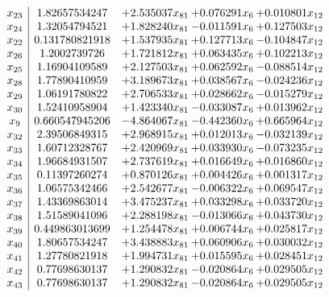 \documentclass[11pt]{article}
\begin{document}
\[\begin{array}{c| c c@{\hskip 2pt} c@{\hskip 2pt} c@{\hskip 2pt} }
 x_{23}   &  1.82657534247 & + 2.535037 x_{81} & + 0.076291 x_{6} & + 0.010801 x_{12}\\
 x_{24}   &  1.32054794521 & + 1.828240 x_{81} & -0.011591 x_{6} & + 0.127503 x_{12}\\
 x_{22}   &  0.131780821918 & + 1.537935 x_{81} & + 0.127713 x_{6} & -0.104847 x_{12}\\
 x_{26}   &  1.2002739726 & + 1.721812 x_{81} & + 0.063435 x_{6} & + 0.102213 x_{12}\\
 x_{25}   &  1.16904109589 & + 2.127503 x_{81} & + 0.062592 x_{6} & -0.088514 x_{12}\\
 x_{28}   &  1.77890410959 & + 3.189673 x_{81} & + 0.038567 x_{6} & -0.024236 x_{12}\\
 x_{29}   &  1.06191780822 & + 2.706533 x_{81} & + 0.028662 x_{6} & -0.015279 x_{12}\\
 x_{30}   &  1.52410958904 & + 1.423340 x_{81} & -0.033087 x_{6} & + 0.013962 x_{12}\\
 x_{9}   &  0.660547945206 & -4.864067 x_{81} & -0.442360 x_{6} & + 0.665964 x_{12}\\
 x_{32}   &  2.39506849315 & + 2.968915 x_{81} & + 0.012013 x_{6} & -0.032139 x_{12}\\
 x_{33}   &  1.60712328767 & + 2.420969 x_{81} & + 0.033930 x_{6} & -0.073235 x_{12}\\
 x_{34}   &  1.96684931507 & + 2.737619 x_{81} & + 0.016649 x_{6} & + 0.016860 x_{12}\\
 x_{35}   &  0.11397260274 & + 0.870126 x_{81} & + 0.004426 x_{6} & + 0.001317 x_{12}\\
 x_{36}   &  1.06575342466 & + 2.542677 x_{81} & -0.006322 x_{6} & + 0.069547 x_{12}\\
 x_{37}   &  1.43369863014 & + 3.475237 x_{81} & + 0.033298 x_{6} & + 0.033720 x_{12}\\
 x_{38}   &  1.51589041096 & + 2.288198 x_{81} & -0.013066 x_{6} & + 0.043730 x_{12}\\
 x_{39}   &  0.449863013699 & + 1.254478 x_{81} & + 0.006744 x_{6} & + 0.025817 x_{12}\\
 x_{40}   &  1.80657534247 & + 3.438883 x_{81} & + 0.060906 x_{6} & + 0.030032 x_{12}\\
 x_{41}   &  1.27780821918 & + 1.994731 x_{81} & + 0.015595 x_{6} & + 0.028451 x_{12}\\
 x_{42}   &  0.77698630137 & + 1.290832 x_{81} & -0.020864 x_{6} & + 0.029505 x_{12}\\
 x_{43}   &  0.77698630137 & + 1.290832 x_{81} & -0.020864 x_{6} & + 0.029505 x_{12}\\

\end{array}\]
\end{document}
